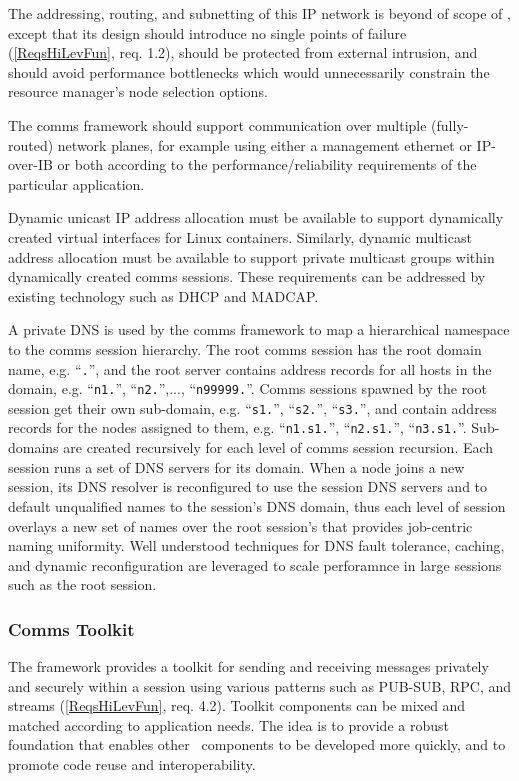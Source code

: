 The addressing, routing, and subnetting of this IP network is beyond of
scope of \ngrm, except that its design should introduce no single
points of failure (\ref{ReqsHiLevFun}, req. 1.2), should be protected
from external intrusion, and should avoid performance bottlenecks which
would unnecessarily constrain the resource manager's node selection options.

The comms framework should support communication over multiple
(fully-routed) network planes, for example using either a management
ethernet or IP-over-IB or both according to the performance/reliability
requirements of the particular application.

Dynamic unicast IP address allocation must be available to support
dynamically created virtual interfaces for Linux containers.  Similarly,
dynamic multicast address allocation must be available to support
private multicast groups within dynamically created comms sessions.
These requirements can be addressed by existing technology such as
DHCP\cite{rfc2131} and MADCAP\cite{rfc2730}.

A private DNS\cite{rfc1034}\cite{rfc1035} is used by the comms framework to
map a hierarchical namespace to the comms session hierarchy.
The root comms session has the root domain name, e.g. ``{\tt \ngrm.}'',
and the root server contains address records for all hosts in the domain, e.g.
``{\tt n1.\ngrm}'', ``{\tt n2.\ngrm}'',..., ``{\tt n99999.\ngrm}''.
Comms sessions spawned by the root session get their own sub-domain, e.g.
``{\tt s1.\ngrm}'', ``{\tt s2.\ngrm}'', ``{\tt s3.\ngrm}'',
and contain address records for the nodes assigned to them, e.g.
``{\tt n1.s1.\ngrm}'', ``{\tt n2.s1.\ngrm}'', ``{\tt n3.s1.\ngrm}''.
Sub-domains are created recursively for each level of comms session
recursion.  Each session runs a set of DNS servers for its domain.
When a node joins a new session, its DNS resolver is reconfigured to use
the session DNS servers and to default unqualified names to the session's
DNS domain, thus each level of session overlays a new set of names over
the root session's that provides job-centric naming uniformity.
Well understood techniques for DNS fault tolerance,
caching, and dynamic reconfiguration are leveraged to scale perforamnce
in large sessions such as the root session.


\subsubsection{Comms Toolkit}

The framework provides a toolkit for sending and receiving
messages privately and securely within a session using
various patterns such as PUB-SUB, RPC, and streams
(\ref{ReqsHiLevFun}, req. 4.2).  Toolkit components can be mixed and
matched according to application needs.
The idea is to provide a robust foundation that enables other
\ngrm\ components to be developed more quickly, and to promote
code reuse and interoperability.

